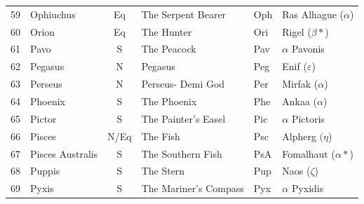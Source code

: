 \documentclass[a4paper,12pt]{extarticle}
\begin{document}
\begin{table}[H]
\begin{tabular}{llclll}
59                         & Ophiuchus                            & Eq                              & The Serpent Bearer                     & Oph                         & Ras Alhague ($\alpha$)                \\
60                         & Orion                                & Eq                              & The Hunter                             & Ori                         & Rigel ($\beta \ast$)                  \\
61                         & Pavo                                 & S                               & The Peacock                            & Pav                         & $\alpha$ Pavonis                      \\
62                         & Pegasus                              & N                               & Pegasus                                & Peg                         & Enif ($\varepsilon$)                  \\
63                         & Perseus                              & N                               & Perseus- Demi God                      & Per                         & Mirfak ($\alpha$)                     \\
64                         & Phoenix                              & S                               & The Phoenix                            & Phe                         & Ankaa ($\alpha$)                      \\
65                         & Pictor                               & S                               & The Painter’s Easel                    & Pic                         & $\alpha$ Pictoris                     \\
66                         & Pisces                               & N/Eq                            & The Fish                               & Psc                         & Alpherg $(\eta$)                        \\
67                         & Pisces Australis                     & S                               & The Southern Fish                      & PsA                         & Fomalhaut ($\alpha\ast$)              \\
68                         & Puppis                               & S                               & The Stern                              & Pup                         & Naos ($\zeta$)                        \\
69                         & Pyxis                                & S                               & The Mariner’s Compass                  & Pyx                         & $\alpha$ Pyxidis                      \\

\end{tabular}
\end{table}
\end{document}
